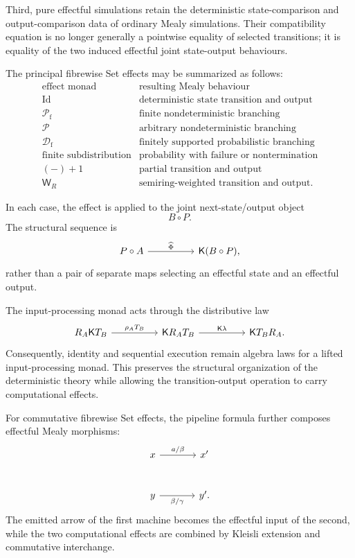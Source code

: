 Third, pure effectful simulations retain the deterministic state-comparison
and output-comparison data of ordinary Mealy simulations. Their compatibility
equation is no longer generally a pointwise equality of selected transitions;
it is equality of the two induced effectful joint state-output behaviours.

The principal fibrewise Set effects may be summarized as follows:
\[
\begin{array}{c|l}
\text{effect monad} & \text{resulting Mealy behaviour} \\
\hline
\mathrm{Id}
&
\text{deterministic state transition and output}
\\
\mathcal P_{\mathrm f}
&
\text{finite nondeterministic branching}
\\
\mathcal P
&
\text{arbitrary nondeterministic branching}
\\
\mathcal D_{\mathrm f}
&
\text{finitely supported probabilistic branching}
\\
\text{finite subdistribution}
&
\text{probability with failure or nontermination}
\\
(-)+1
&
\text{partial transition and output}
\\
\mathsf W_R
&
\text{semiring-weighted transition and output.}
\end{array}
\]

In each case, the effect is applied to the joint next-state/output object
\[
    B\circ P.
\]
The structural sequence is
\[
    \begin{tikzcd}[column sep=huge]
            P\circ A
                \arrow[r, "\widehat\Phi"]
        &
            \mathsf K(B\circ P),
    \end{tikzcd}
\]
rather than a pair of separate maps selecting an effectful state and an
effectful output.

The input-processing monad acts through the distributive law
\[
    \begin{tikzcd}[column sep=huge]
            R_A\mathsf K T_B
                \arrow[r, "\rho_A T_B"]
        &
            \mathsf K R_AT_B
                \arrow[r, "\mathsf K\lambda"]
        &
            \mathsf K T_BR_A.
    \end{tikzcd}
\]
Consequently, identity and sequential execution remain algebra laws for a
lifted input-processing monad. This preserves the structural organization of
the deterministic theory while allowing the transition-output operation to
carry computational effects.

For commutative fibrewise Set effects, the pipeline formula further composes
effectful Mealy morphisms:
\[
    \begin{tikzcd}[column sep=large, row sep=large]
            x
                \arrow[r, "{a/\beta}"]
        &
            x'
        \\
            y
                \arrow[r, "{\beta/\gamma}"']
        &
            y'.
    \end{tikzcd}
\]
The emitted arrow of the first machine becomes the effectful input of the
second, while the two computational effects are combined by Kleisli extension
and commutative interchange.